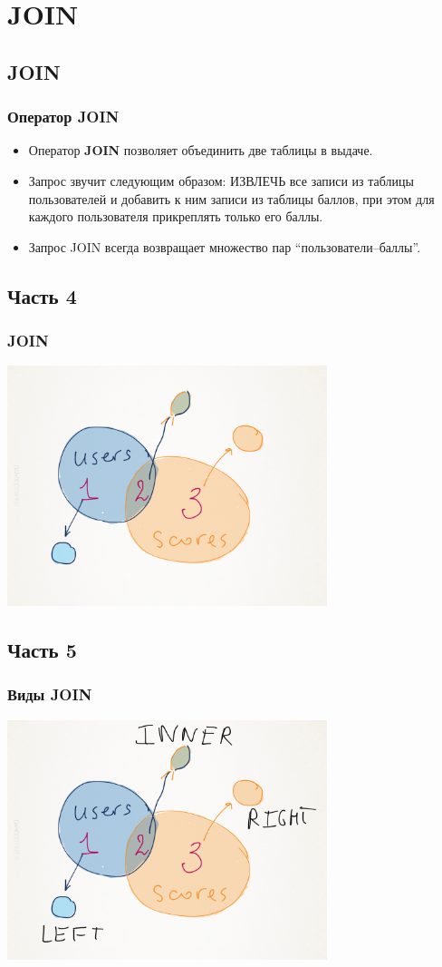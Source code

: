 \documentclass[compress,red]{beamer}
\begin{document}
\section{JOIN}
\subsection{JOIN}
\begin{frame}[fragile]
  \frametitle{Оператор JOIN}
  \begin{itemize}
    \item Оператор \textbf{JOIN} позволяет объединить две таблицы в выдаче.
    \item Запрос звучит следующим образом: ИЗВЛЕЧЬ все записи из таблицы пользователей и добавить к ним записи из таблицы баллов, при этом для каждого пользователя прикреплять только его баллы.
    \item Запрос JOIN всегда возвращает множество пар ``пользователи--баллы''.
  \end{itemize}
\end{frame}

\subsection{Часть 4}
\begin{frame}[fragile]
  \frametitle{JOIN}
  \centerline{\includegraphics[width=0.7\textwidth]{images/manual4.png}}
\end{frame}

\subsection{Часть 5}
\begin{frame}[fragile]
  \frametitle{Виды JOIN}
  \centerline{\includegraphics[width=0.7\textwidth]{images/manual5.png}}
\end{frame}
\end{document}
